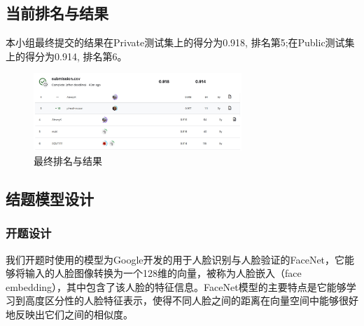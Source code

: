 \documentclass[UTF8]{ctexart}
\begin{document}
\subsection{当前排名与结果}
本小组最终提交的结果在Private测试集上的得分为0.918, 排名第5;在Public测试集上的得分为0.914, 排名第6。
\begin{figure}[!ht]
    \centering
    \includegraphics[width=0.7\textwidth]{score.png}
    \caption{最终排名与结果}
    \label{fig:score}
\end{figure}

\subsection{结题模型设计}
\subsubsection{开题设计}
我们开题时使用的模型为Google开发的用于人脸识别与人脸验证的FaceNet，它能够将输入的人脸图像转换为一个128维的向量，被称为人脸嵌入（face embedding），其中包含了该人脸的特征信息。FaceNet模型的主要特点是它能够学习到高度区分性的人脸特征表示，使得不同人脸之间的距离在向量空间中能够很好地反映出它们之间的相似度。
\end{document}
